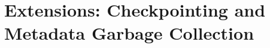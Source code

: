 \documentclass{article}
\begin{document}
\section{Extensions: Checkpointing and Metadata Garbage Collection}



\end{document}
